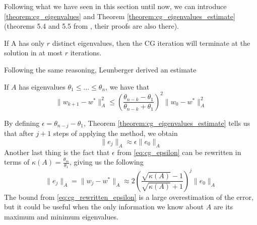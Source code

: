 \noindent Following what we have seen in this section until now, we can introduce \autoref{theorem:cg_eigenvalues} and Theorem \ref{theorem:cg_eigenvalues_estimate} (theorems 5.4 and 5.5 from \cite{nocedal1999numerical}, their proofs are also there).
\begin{theorem}
    If A has only $r$ distinct eigenvalues, then the CG iteration will terminate at the solution in at most $r$ iterations.
    \label{theorem:cg_eigenvalues}
\end{theorem}
Following the same reasoning, Leunberger derived an estimate
\begin{theorem}
    If $A$ has eigenvalues $\theta_1\leq\dots\leq\theta_n$, we have that
    \begin{equation}
        \lVert w_{k+1}-w^*\rVert_A^2\leq \left(\frac{\theta_{n-k}-\theta_1}{\theta_{n-k}+\theta_1}\right)^2\lVert w_0-w^*\rVert_A^2
    \end{equation}
    \label{theorem:cg_eigenvalues_estimate}
\end{theorem}
By defining $\epsilon=\theta_{n-j}-\theta_1$, Theorem \ref{theorem:cg_eigenvalues_estimate} tells us that after $j+1$ steps of applying the method, we obtain
\begin{equation}
    \lVert e_j\rVert_A\approx\epsilon\lVert e_0\rVert_A
    \label{eq:cg_epsilon}
\end{equation}
Another last thing is the fact that $\epsilon$ from \eqref{eq:cg_epsilon} can be rewritten in terms of $\kappa(A)=\frac{\theta_m}{\theta_1}$, giving us the following
\begin{equation}
    \lVert e_j \rVert_A=\lVert w_{j}-w^*\rVert_A\approx2\left(\frac{\sqrt{\kappa(A)}-1}{\sqrt{\kappa(A)}+1}\right)^j\lVert e_0\rVert_A
    \label{eq:cg_rewritten_epsilon}
\end{equation}
The bound from \eqref{eq:cg_rewritten_epsilon} is a large overestimation of the error, but it could be useful when the only information we know about $A$ are its maximum and minimum eigenvalues.

